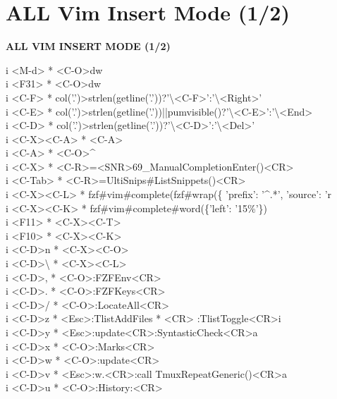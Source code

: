 \documentclass[11pt,a4paper,twoside]{book}
\begin{document}
\vspace{16pt}

\section{ALL Vim Insert Mode (1/2)}


\vspace{10pt}
{\large\bfseries\color{neoncyan} ALL VIM INSERT MODE (1/2)}\vspace{6pt}

i  <M-d>  * <C-O>dw\\
i  <F31>  * <C-O>dw\\
i  <C-F>  * col('.')>strlen(getline('.'))?'\textbackslash{}<C-F>':'\textbackslash{}<Right>'\\
i  <C-E>  * col('.')>strlen(getline('.'))||pumvisible()?'\textbackslash{}<C-E>':'\textbackslash{}<End>\\
i  <C-D>  * col('.')>strlen(getline('.'))?'\textbackslash{}<C-D>':'\textbackslash{}<Del>'\\
i  <C-X><C-A>  * <C-A>\\
i  <C-A>  * <C-O>\textasciicircum{}\\
i  <C-X>  * <C-R>=<SNR>69\_ManualCompletionEnter()<CR>\\
i  <C-Tab>  * <C-R>=UltiSnips\#ListSnippets()<CR>\\
i  <C-X><C-L>  * fzf\#vim\#complete(fzf\#wrap(\{ 'prefix': '\textasciicircum{}.*', 'source': 'r\\
i  <C-X><C-K>  * fzf\#vim\#complete\#word(\{'left': '15\%'\})\\
i  <F11>  * <C-X><C-T>\\
i  <F10>  * <C-X><C-K>\\
i  <C-D>n  * <C-X><C-O>\\
i  <C-D>\textbackslash{}  * <C-X><C-L>\\
i  <C-D>,  * <C-O>:FZFEnv<CR>\\
i  <C-D>.  * <C-O>:FZFKeys<CR>\\
i  <C-D>/  * <C-O>:LocateAll<CR>\\
i  <C-D>z  * <Esc>:TlistAddFiles * <CR> :TlistToggle<CR>i\\
i  <C-D>y  * <Esc>:update<CR>:SyntasticCheck<CR>a\\
i  <C-D>x  * <C-O>:Marks<CR>\\
i  <C-D>w  * <C-O>:update<CR>\\
i  <C-D>v  * <Esc>:w.<CR>:call TmuxRepeatGeneric()<CR>a\\
i  <C-D>u  * <C-O>:History:<CR>\\
\end{document}
